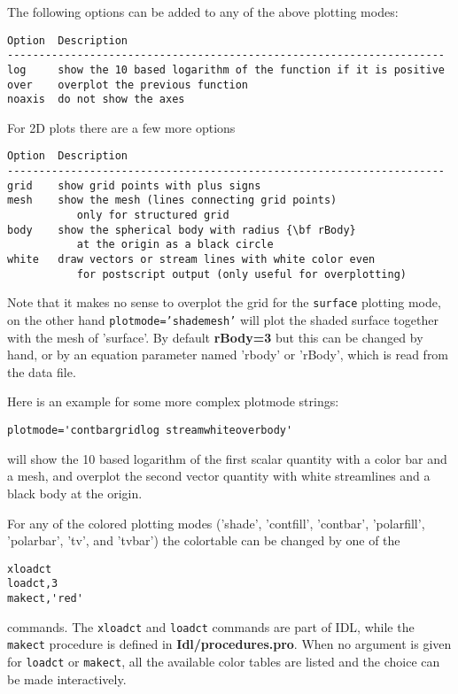 The following options can be added to any of the above plotting modes:
\begin{verbatim}
Option  Description
---------------------------------------------------------------------
log     show the 10 based logarithm of the function if it is positive
over    overplot the previous function
noaxis  do not show the axes
\end{verbatim}

For 2D plots there are a few more options
\begin{verbatim}
Option  Description
---------------------------------------------------------------------
grid    show grid points with plus signs
mesh    show the mesh (lines connecting grid points) 
           only for structured grid
body    show the spherical body with radius {\bf rBody} 
           at the origin as a black circle
white   draw vectors or stream lines with white color even 
           for postscript output (only useful for overplotting)
\end{verbatim}
   Note that it makes no sense to overplot the grid for the 
   {\tt surface} plotting mode, on the other hand {\tt plotmode='shademesh'}
   will plot the shaded surface together with the mesh of 'surface'.
   By default {\bf rBody=3} but this can be changed by hand, or by an equation
   parameter named 'rbody' or 'rBody', which is read from the data file.

   Here is an example for some more complex plotmode strings:
\begin{verbatim}
plotmode='contbargridlog streamwhiteoverbody'
\end{verbatim} 
   will show the 10 based logarithm of the first scalar quantity with a color bar 
   and a mesh, and overplot the second vector quantity with white streamlines
   and a black body at the origin.

   For any of the colored plotting modes ('shade', 'contfill', 'contbar', 
   'polarfill', 'polarbar', 'tv', and 'tvbar') the colortable can be 
   changed by one of the 
\begin{verbatim}
xloadct
loadct,3
makect,'red'
\end{verbatim}
   commands. The {\tt xloadct} and {\tt loadct} commands are part of IDL, while
   the {\tt makect} procedure is defined in {\bf Idl/procedures.pro}.
   When no argument is given for {\tt loadct} or {\tt makect}, 
   all the available color tables are listed
   and the choice can be made interactively.

